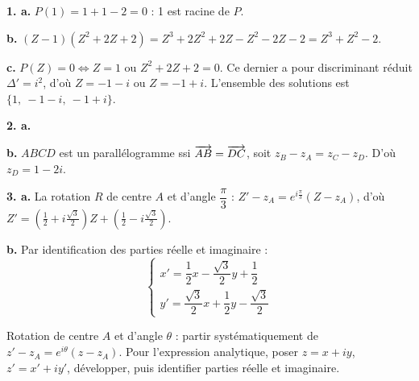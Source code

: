 \documentclass[11pt]{article}
\begin{document}

\textbf{1. a.} $P(1) = 1 + 1 - 2 = 0$ : 1 est racine de $P$.

\textbf{b.} $(Z - 1)(Z^2 + 2Z + 2) = Z^3 + 2Z^2 + 2Z - Z^2 - 2Z - 2 = Z^3 + Z^2 - 2$.

\textbf{c.} $P(Z) = 0 \Leftrightarrow Z = 1$ ou $Z^2 + 2Z + 2 = 0$. Ce dernier a pour discriminant réduit $\Delta' = i^2$, d'où $Z = -1 - i$ ou $Z = -1 + i$. L'ensemble des solutions est $\{1,\ -1 - i,\ -1 + i\}$.

\textbf{2. a.}
\begin{center}
\end{center}

\textbf{b.} $ABCD$ est un parallélogramme ssi $\overrightarrow{AB} = \overrightarrow{DC}$, soit $z_B - z_A = z_C - z_D$. D'où $z_D = 1 - 2i$.

\textbf{3. a.} La rotation $R$ de centre $A$ et d'angle $\dfrac{\pi}{3}$ : $Z' - z_A = e^{i\frac{\pi}{3}}(Z - z_A)$, d'où $Z' = \left(\tfrac{1}{2} + i\tfrac{\sqrt{3}}{2}\right)Z + \left(\tfrac{1}{2} - i\tfrac{\sqrt{3}}{2}\right)$.

\textbf{b.} Par identification des parties réelle et imaginaire :
\[ \begin{cases} x' = \dfrac{1}{2}x - \dfrac{\sqrt{3}}{2}y + \dfrac{1}{2} \\[1ex] y' = \dfrac{\sqrt{3}}{2}x + \dfrac{1}{2}y - \dfrac{\sqrt{3}}{2} \end{cases} \]

\begin{methode}
Rotation de centre $A$ et d'angle $\theta$ : partir systématiquement de
$z' - z_A = e^{i\theta}(z - z_A)$. Pour l'expression analytique, poser
$z = x + iy$, $z' = x' + iy'$, développer, puis identifier parties
réelle et imaginaire.
\end{methode}
\end{document}
